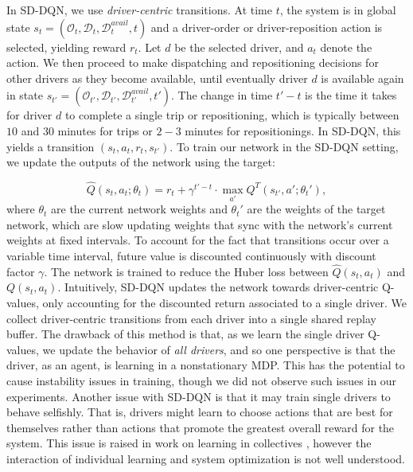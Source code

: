 In SD-DQN, we use {\em driver-centric} transitions. At time $t$, the system is in global state $s_t = (\mathcal{O}_t, \mathcal{D}_t, \mathcal{D}^{avail}_t, t)$ and a driver-order or driver-reposition action is selected, yielding reward $r_t$. Let $d$ be the selected driver, and $a_t$ denote the action. We then proceed to make dispatching and repositioning decisions for other drivers as they become available, until eventually driver $d$ is available again in state $s_{t'} = (\mathcal{O}_{t'}, \mathcal{D}_{t'}, \mathcal{D}^{avail}_{t'}, t')$. The change in time $t'-t$ is the time it takes for driver $d$ to complete a single trip or repositioning, which is typically between $10$ and $30$ minutes for trips or $2-3$ minutes for repositionings. In SD-DQN, this yields a transition $(s_t, a_t, r_t, s_{t'})$. To train our network in the SD-DQN setting, we update the outputs of the network using the target:
% 

\begin{equation}
% 
% 
\widehat{Q}(s_t, a_t; \theta_t) = r_t + \gamma^{t' - t} \cdot \max_{a'} Q^T(s_{t'}, a'; \theta_t'),
\end{equation}
where $\theta_t$ are the current network weights and $\theta_t'$ are the weights of the target network, which are slow updating weights that sync with the network's current weights at fixed intervals. To account for the fact that transitions occur over a variable time interval, future value is discounted continuously with discount factor $\gamma$. The network is trained to reduce the Huber loss between $\widehat{Q}(s_t, a_t)$ and $Q(s_t, a_t)$. Intuitively, SD-DQN updates the network towards driver-centric Q-values, only accounting for the discounted return associated to a single driver. We collect driver-centric transitions from each driver into a single shared replay buffer. The drawback of this method is that, as we learn the single driver Q-values, we update the behavior of {\em all drivers}, and so one perspective is that the driver, as an agent, is learning in a nonstationary MDP. This has the potential to cause instability issues in training, though we did not observe such issues in our experiments. Another issue with SD-DQN is that it may train single drivers to behave selfishly. That is, drivers might learn to choose actions that are best for themselves rather than actions that promote the greatest overall reward for the system. This issue is raised in work on learning in collectives \cite{wolpert2002optimal,tumer2004time}, however the interaction of individual learning and system optimization is not well understood.
% 

